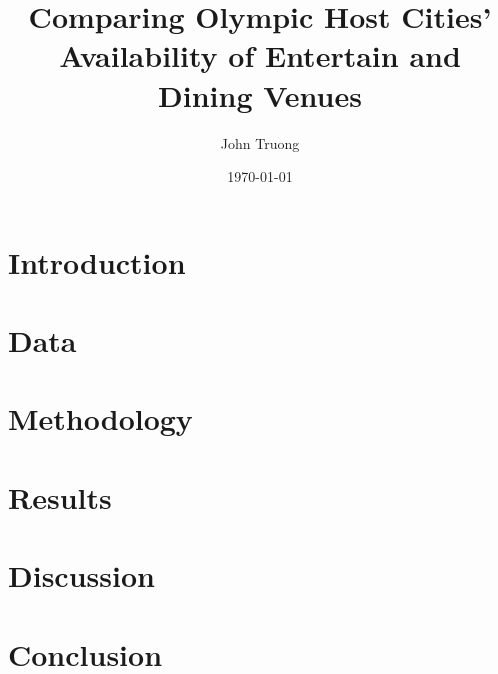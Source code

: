 \documentclass[%
 reprint,
 amsmath,amssymb,
 aps,
prb,
prstab,
floatfix,
]{revtex4-2}
\begin{document}

\title{Comparing Olympic Host Cities' Availability of Entertain and Dining Venues}

\author{John Truong}


\date{\today}

\begin{abstract}
    \lipsum[1]
\end{abstract}

\maketitle

\section{Introduction}
    \lipsum[2]
\section{Data}
    \lipsum[3-4]
\section{Methodology}
    \lipsum[5-6]
\section{Results}
    \lipsum[7-8]
\section{Discussion}
    \lipsum[9-10]
\section{Conclusion}
    \lipsum[11]


\end{document}
